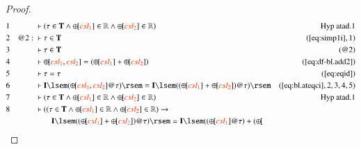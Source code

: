 \begin{proof}
\begin{align}
  1 &&  & \vdash ( \tau \in \mathbf{T} \wedge {\oplus\hspace{-1pt}[}
      \msc{csl_1} ] \in \mathbb{R} \wedge
      {\oplus\hspace{-1pt}[} \msc{csl_2} ] \in \mathbb{R}
      )&\text{Hyp~atad.1}\notag%
  \\ 2 && @2:\  & \vdash \tau \in \mathbf{T}&(\mbox{\ref{eq:simp1i}},1)\notag
  \\ 3 &&  & \vdash \tau \in \mathbf{T}&(@2)\notag
  \\ 4 &&  & \vdash {\oplus\hspace{-1pt}[} \msc{csl_1} , \msc{csl_2} ] = (
      {\oplus\hspace{-1pt}[} \msc{csl_1} ] +
      {\oplus\hspace{-1pt}[} \msc{csl_2} ]
      )&(\mbox{\ref{eq:df-bl.add2}})\notag
  \\ 5 &&  & \vdash \tau = \tau&(\mbox{\ref{eq:eqid}})\notag
  \\ 6 &&  & \vdash \mathbf{I} \lsem ( {\oplus\hspace{-1pt}[} \msc{csl_1} ,
      \msc{csl_2} ] @ \tau ) \rsem = \mathbf{I} \lsem ( (
      {\oplus\hspace{-1pt}[} \msc{csl_1} ] +
      {\oplus\hspace{-1pt}[} \msc{csl_2} ] ) @ \tau )
      \rsem&(\mbox{\ref{eq:bl.ateqci}},2,3,4,5)\notag
  \\ 7 &&  & \vdash ( \tau \in \mathbf{T} \wedge {\oplus\hspace{-1pt}[}
      \msc{csl_1} ] \in \mathbb{R} \wedge
      {\oplus\hspace{-1pt}[} \msc{csl_2} ] \in \mathbb{R}
      )&\text{Hyp~atad.1}\notag%
  \\ 8 &&  & \vdash ( ( \tau \in \mathbf{T} \wedge {\oplus\hspace{-1pt}[}
      \msc{csl_1} ] \in \mathbb{R} \wedge
      {\oplus\hspace{-1pt}[} \msc{csl_2} ] \in \mathbb{R} )
      \rightarrow  \notag \\ & & & \qquad
      \mathbf{I} \lsem ( (
      {\oplus\hspace{-1pt}[} \msc{csl_1} ] +
      {\oplus\hspace{-1pt}[} \msc{csl_2} ] ) @ \tau ) \rsem
      = \mathbf{I} \lsem ( ( {\oplus\hspace{-1pt}[}
      \msc{csl_1} ] @ \tau ) + ( {\oplus\hspace{-1pt}[}

\end{align}
\end{proof}
